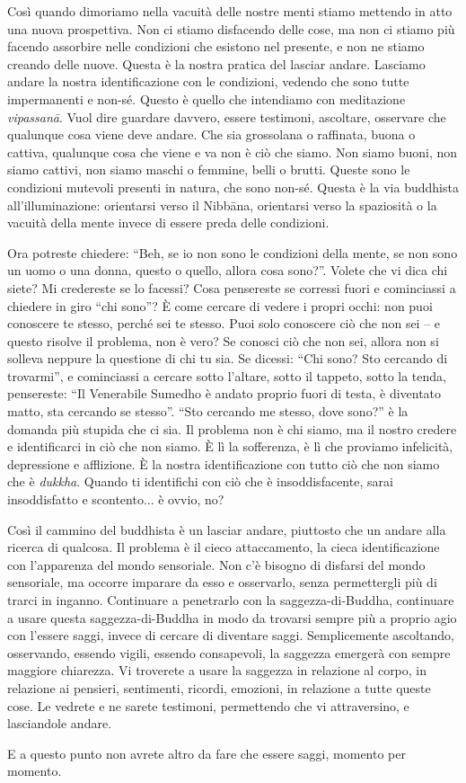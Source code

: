 Così quando dimoriamo nella vacuità delle nostre menti stiamo mettendo
in atto una nuova prospettiva. Non ci stiamo disfacendo delle cose, ma
non ci stiamo più facendo assorbire nelle condizioni che esistono nel
presente, e non ne stiamo creando delle nuove. Questa è la nostra
pratica del lasciar andare. Lasciamo andare la nostra identificazione
con le condizioni, vedendo che sono tutte impermanenti e non-sé. Questo
è quello che intendiamo con meditazione \emph{vipassanā}. Vuol dire
guardare davvero, essere testimoni, ascoltare, osservare che qualunque
cosa viene deve andare. Che sia grossolana o raffinata, buona o cattiva,
qualunque cosa che viene e va non è ciò che siamo. Non siamo buoni, non
siamo cattivi, non siamo maschi o femmine, belli o brutti. Queste sono
le condizioni mutevoli presenti in natura, che sono non-sé. Questa è la
via buddhista all'illuminazione: orientarsi verso il Nibbāna, orientarsi
verso la spaziosità o la vacuità della mente invece di essere preda
delle condizioni.

Ora potreste chiedere: ``Beh, se io non sono le condizioni della mente,
se non sono un uomo o una donna, questo o quello, allora cosa sono?''.
Volete che vi dica chi siete? Mi credereste se lo facessi? Cosa
pensereste se corressi fuori e cominciassi a chiedere in giro ``chi
sono''? È come cercare di vedere i propri occhi: non puoi conoscere te
stesso, perché sei te stesso. Puoi solo conoscere ciò che non sei -- e
questo risolve il problema, non è vero? Se conosci ciò che non sei,
allora non si solleva neppure la questione di chi tu sia. Se dicessi:
``Chi sono? Sto cercando di trovarmi'', e cominciassi a cercare sotto
l'altare, sotto il tappeto, sotto la tenda, pensereste: ``Il Venerabile
Sumedho è andato proprio fuori di testa, è diventato matto, sta cercando
se stesso''. ``Sto cercando me stesso, dove sono?'' è la domanda più
stupida che ci sia. Il problema non è chi siamo, ma il nostro credere e
identificarci in ciò che non siamo. È lì la sofferenza, è lì che
proviamo infelicità, depressione e afflizione. È la nostra
identificazione con tutto ciò che non siamo che è \emph{dukkha}. Quando
ti identifichi con ciò che è insoddisfacente, sarai insoddisfatto e
scontento... è ovvio, no?

Così il cammino del buddhista è un lasciar andare, piuttosto che un
andare alla ricerca di qualcosa. Il problema è il cieco attaccamento, la
cieca identificazione con l'apparenza del mondo sensoriale. Non c'è
bisogno di disfarsi del mondo sensoriale, ma occorre imparare da esso e
osservarlo, senza permettergli più di trarci in inganno. Continuare a
penetrarlo con la saggezza-di-Buddha, continuare a usare questa
saggezza-di-Buddha in modo da trovarsi sempre più a proprio agio con
l'essere saggi, invece di cercare di diventare saggi. Semplicemente
ascoltando, osservando, essendo vigili, essendo consapevoli, la saggezza
emergerà con sempre maggiore chiarezza. Vi troverete a usare la saggezza
in relazione al corpo, in relazione ai pensieri, sentimenti, ricordi,
emozioni, in relazione a tutte queste cose. Le vedrete e ne sarete
testimoni, permettendo che vi attraversino, e lasciandole andare.

E a questo punto non avrete altro da fare che essere saggi, momento per
momento.